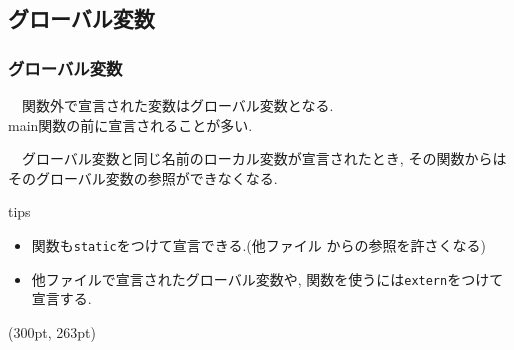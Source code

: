 \documentclass[dvipdfmx]{beamer}
\begin{document}
\subsection{グローバル変数}
\begin{frame}[t, fragile]
    \frametitle{グローバル変数}
    　関数外で宣言された変数はグローバル変数となる.\\
    main関数の前に宣言されることが多い.
    \vspace{-15pt}
    \begin{table}
    \centering
    \end{table}
    　グローバル変数と同じ名前のローカル変数が宣言されたとき,
        その関数からはそのグローバル変数の参照ができなくなる.
    \begin{itembox}[l]{tips}
        \begin{itemize}
            \item 関数も\texttt{static}をつけて宣言できる.(他ファイル
                からの参照を許さくなる)
            \vspace{-3pt}
            \item 他ファイルで宣言されたグローバル変数や,
                関数を使うには\texttt{extern}をつけて宣言する.
        \end{itemize}
    \end{itembox}
    \begin{textblock*}{0.3\linewidth}(300pt, 263pt)
    \space
    \end{textblock*}
\end{frame}
\end{document}
